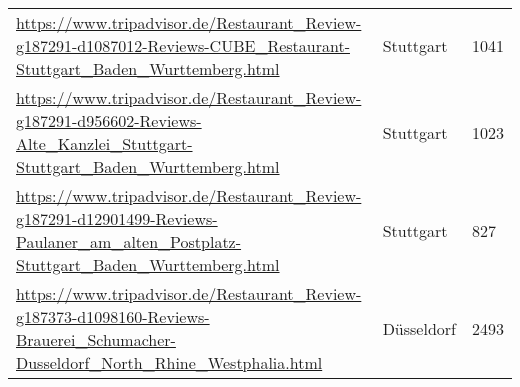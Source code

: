 \begin{table}[]
{\begin{tabular}{lll}
\url{https://www.tripadvisor.de/Restaurant\_Review-g187291-d1087012-Reviews-CUBE\_Restaurant-Stuttgart\_Baden\_Wurttemberg.html} & Stuttgart & 1041 \\ 
\url{https://www.tripadvisor.de/Restaurant\_Review-g187291-d956602-Reviews-Alte\_Kanzlei\_Stuttgart-Stuttgart\_Baden\_Wurttemberg.html} & Stuttgart & 1023 \\ 
\url{https://www.tripadvisor.de/Restaurant\_Review-g187291-d12901499-Reviews-Paulaner\_am\_alten\_Postplatz-Stuttgart\_Baden\_Wurttemberg.html} & Stuttgart & 827 \\ 
\url{https://www.tripadvisor.de/Restaurant\_Review-g187373-d1098160-Reviews-Brauerei\_Schumacher-Dusseldorf\_North\_Rhine\_Westphalia.html} & Düsseldorf & 2493 \\ 
\hline
\end{tabular}
}
\end{table}
